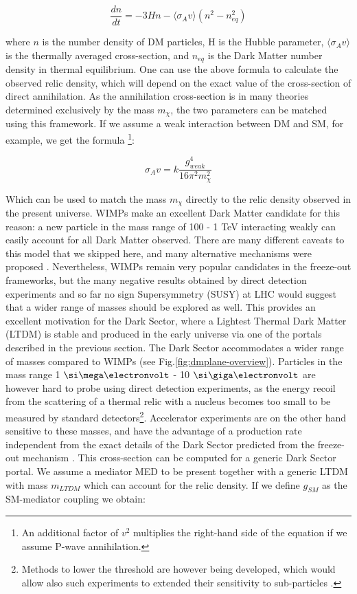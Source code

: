   \begin{equation}
    \label{eq:boltzman-equation}
    \frac{d n}{d t} = -3 H n - \langle \sigma_A v \rangle (n^2 - n^2_{eq})
  \end{equation}

  where $n$ is the number density of DM particles, H is the Hubble parameter,  $\langle \sigma_A v \rangle$ is the thermally averaged cross-section, and $n_{eq}$ is the Dark Matter number density in thermal equilibrium. One can use the above formula to calculate the observed relic density, which will depend on the exact value of the cross-section of direct annihilation. As the annihilation cross-section is in many theories determined exclusively by the mass $m_{\chi}$, the two parameters can be matched using this framework. If we assume a weak interaction between DM and SM, for example, we get the formula \cite{Feng:2010gw}\footnote{An additional factor of $v^2$ multiplies the right-hand side of the equation if we assume P-wave annihilation.}:

  \begin{equation}
    \label{eq:dm-fo-sigma}
    \sigma_A v = k \frac{g^4_{weak}}{16 \pi^2 m^2_{\chi}}
  \end{equation}

  Which can be used to match the mass $m_{\chi}$ directly to the relic density observed in the present universe. WIMPs make an excellent Dark Matter candidate for this reason: a new particle in the mass range of 100 \gev - 1 \si{\tera\electronvolt} interacting weakly can easily account for all Dark Matter observed. There are many different caveats to this model that we skipped here, and many alternative mechanisms were proposed \cite{Hall:2009bx,Feng:2010gw,Marsh:2015xka,Griest:1990kh,Arcadi:2017kky}. Nevertheless, WIMPs remain very popular candidates in the freeze-out frameworks, but the many negative results obtained by direct detection experiments and so far no sign Supersymmetry (SUSY) at LHC would suggest that a wider range of masses should be explored as well. This provides an excellent motivation for the Dark Sector, where a Lightest Thermal Dark Matter (LTDM) is stable and produced in the early universe via one of the portals described in the previous section. The Dark Sector accommodates a wider range of masses compared to WIMPs (see Fig.\ref{fig:dmplane-overview}). Particles in the mass range 1 $\mev$ - 10 $\gev$ are however hard to probe using direct detection experiments, as the energy recoil from the scattering of a thermal relic with a nucleus becomes too small to be measured by standard detectors\footnote{Methods to lower the threshold are however being developed, which would allow also such experiments to extended their sensitivity to sub-\gev particles \cite{Baracchini:2020nut}.}. Accelerator experiments are on the other hand sensitive to these masses, and have the advantage of a production rate independent from the exact details of the Dark Sector predicted from the freeze-out mechanism \cite{battaglieri2017cosmic}. This cross-section can be computed for a generic Dark Sector portal. We assume a mediator MED to be present together with a generic LTDM with mass $m_{LTDM}$ which can account for the relic density. If we define $g_{SM}$ as the SM-mediator coupling we obtain:

